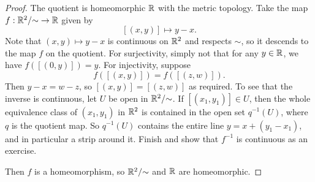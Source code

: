 \begin{proof}
  The quotient is homeomorphic $\mathbb{R}$ with the metric
  topology. Take the
  map $f : \mathbb{R}^2 / {\sim} \to \mathbb{R}$ given by
  \[
    [(x, y)] \mapsto y - x.
  \]
  Note that $(x, y) \mapsto y - x$ is continuous
  on $\mathbb{R}^2$ and respects $\sim$, so it descends
  to the map $f$ on the quotient. For surjectivity,
  simply not that for any $y \in \mathbb{R}$, we
  have $f([(0, y)]) = y$. For injectivity, suppose
  \[
    f([(x, y)]) = f([(z, w)]).
  \]
  Then $y - x = w - z$, so $[(x, y)] = [(z, w)]$
  as required. To see that the inverse is
  continuous, let $U$ be open in $\mathbb{R}^2 / {\sim}$.
  If $[(x_1, y_1)] \in U$, then the whole equivalence
  class of $(x_1, y_1)$ in $\mathbb{R}^2$ is contained
  in the open set $q^{-1}(U)$, where $q$ is
  the quotient map. So $q^{-1}(U)$ contains
  the entire line $y = x + (y_1 - x_1)$, and
  in particular a strip around it. Finish and show
  that $f^{-1}$ is continuous as an exercise.

  Then $f$ is a homeomorphism, so
  $\mathbb{R}^2 / {\sim}$ and $\mathbb{R}$ are homeomorphic.
\end{proof}
